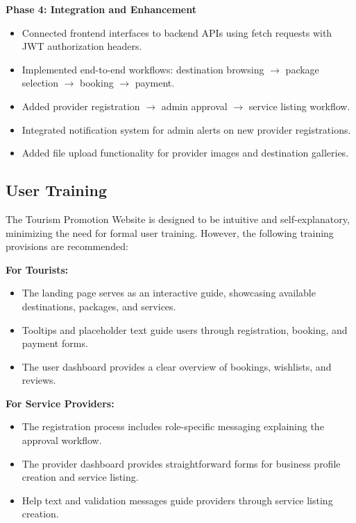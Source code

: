 \textbf{Phase 4: Integration and Enhancement}
\begin{itemize}[leftmargin=2em]
    \item Connected frontend interfaces to backend APIs using fetch requests with JWT authorization headers.
    \item Implemented end-to-end workflows: destination browsing $\rightarrow$ package selection $\rightarrow$ booking $\rightarrow$ payment.
    \item Added provider registration $\rightarrow$ admin approval $\rightarrow$ service listing workflow.
    \item Integrated notification system for admin alerts on new provider registrations.
    \item Added file upload functionality for provider images and destination galleries.
\end{itemize}

\subsection{User Training}

The Tourism Promotion Website is designed to be intuitive and self-explanatory, minimizing the need for formal user training. However, the following training provisions are recommended:

\textbf{For Tourists:}
\begin{itemize}[leftmargin=2em]
    \item The landing page serves as an interactive guide, showcasing available destinations, packages, and services.
    \item Tooltips and placeholder text guide users through registration, booking, and payment forms.
    \item The user dashboard provides a clear overview of bookings, wishlists, and reviews.
\end{itemize}

\textbf{For Service Providers:}
\begin{itemize}[leftmargin=2em]
    \item The registration process includes role-specific messaging explaining the approval workflow.
    \item The provider dashboard provides straightforward forms for business profile creation and service listing.
    \item Help text and validation messages guide providers through service listing creation.
\end{itemize}

